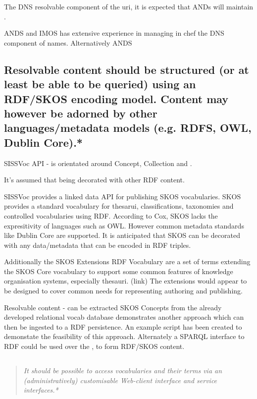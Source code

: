 \documentclass[10pt,a4paper]{article}
\newenvironment{italicquotes}
{\begin{quote}\itshape}
{\end{quote}}
\begin{document}
\begin{flushleft}
  The DNS resolvable component of the uri, it is expected that ANDs will maintain
  . 


  ANDS and IMOS has extensive experience in managing in chef the DNS component of
  names. Alternatively ANDS






\subsection{Resolvable content should be structured (or at least be able to be queried)
  using an RDF/SKOS encoding model. Content may however be adorned by other
  languages/metadata models (e.g. RDFS, OWL, Dublin Core).* }

  SISSVoc API - is orientated around Concept, Collection and .

  It's assumed that being decorated with other RDF content.
  

	SISSVoc provides a linked data API for publishing SKOS vocabularies.
  SKOS provides a standard vocabulary for thesarui, classifications, taxonomies
  and controlled vocabularies using RDF.
   According to Cox, SKOS lacks the expresitivity of languages such as OWL.
  However common metadata standards like Dublin Core are supported.
    It is anticipated that SKOS can be decorated with any data/metadata that can
  be encoded in RDF triples.


	Additionally the SKOS Extensions RDF Vocabulary are a set of terms extending
	the SKOS Core vocabulary to support some common features of knowledge
	organisation systems, especially thesauri. (link) The extensions would appear
	to be designed to cover common needs for representing authoring and publishing.

	Resolvable content - can be extracted SKOS Concepts from the already developed
	relational vocab database demonstrates another approach which can then be
	ingested to a RDF persistence. An example script has been created to demonstate
	the feasibility of this approach. Alternately a SPARQL interface to RDF could
	be used over the , to form RDF/SKOS content.


  \subsection{} 
  \begin{italicquotes} 
  It should be possible to access vocabularies and their terms via an 
  (administratively) customisable Web-client interface and service interfaces.*


\end{italicquotes}
\end{flushleft}
\end{document}
